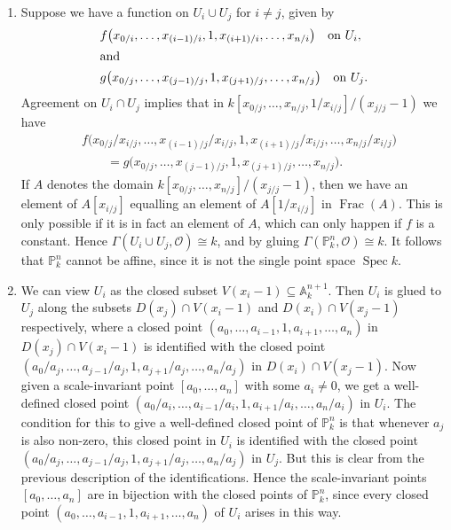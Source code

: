 \documentclass{report}
\renewcommand{\O}{\mathscr{O}} %
\newcommand{\A}{\mathbb{A}}
\renewcommand{\P}{\mathbb{P}} %
\DeclareMathOperator{\Frac}{Frac}
\DeclareMathOperator{\Spec}{Spec}
\begin{document}
\begin{enumerate}[label=\textbf{4.4.\Alph*.}]
	\item Suppose we have a function on $U_i\cup U_j$ for $i\ne j$, given by
	      \begin{align*}
		       & f\bigl(x_{0/i},\ldots,x_{(i-1)/i},1,x_{(i+1)/i},\ldots,x_{n/i}\bigr)
		      \quad\text{on $U_i$},                                                   \\
		      \intertext{and}
		       & g\bigl(x_{0/j},\ldots,x_{(j-1)/j},1,x_{(j+1)/j},\ldots,x_{n/j}\bigr)
		      \quad\text{on $U_j$}.
	      \end{align*}
	      Agreement on $U_i\cap U_j$ implies that in
	      $k[x_{0/j},\ldots,x_{n/j},1/x_{i/j}]/(x_{j/j}-1)$ we have
	      \begin{align*}
		       & f\bigl(x_{0/j}/x_{i/j},\ldots,x_{(i-1)/j}/x_{i/j},1,x_{(i+1)/j}/x_{i/j},\ldots,x_{n/j}/x_{i/j}\bigr) \\
		       & \qquad= g\bigl(x_{0/j},\ldots,x_{(j-1)/j},1,x_{(j+1)/j},\ldots,x_{n/j}\bigr).
	      \end{align*}
	      If $A$ denotes the domain $k[x_{0/j},\ldots,x_{n/j}]/(x_{j/j}-1)$, then
	      we have an element of $A[x_{i/j}]$ equalling an element of $A[1/x_{i/j}]$
	      in $\Frac(A)$. This is only possible if it is in fact an element of $A$,
	      which can only happen if $f$ is a constant. Hence
	      $\Gamma(U_i\cup U_j,\O)\cong k$, and by gluing
	      $\Gamma(\P^n_k,\O)\cong k$. It follows that $\P^n_k$ cannot be affine,
	      since it is not the single point space $\Spec k$.

	\item We can view $U_i$ as the closed subset $V(x_i-1)\subseteq\A^{n+1}_k$.
	      Then $U_i$ is glued to $U_j$ along the subsets $D(x_j)\cap V(x_i-1)$
	      and $D(x_i)\cap V(x_j-1)$ respectively, where a closed point
	      $(a_0,\ldots,a_{i-1},1,a_{i+1},\ldots,a_n)$ in $D(x_j)\cap V(x_i-1)$ is
	      identified with the closed point
	      $(a_0/a_j,\ldots,a_{j-1}/a_j,1,a_{j+1}/a_j,\ldots,a_n/a_j)$ in
	      $D(x_i)\cap V(x_j-1)$. Now given a scale-invariant point
	      $[a_0,\ldots,a_n]$ with some $a_i\ne0$, we get a well-defined closed
	      point $(a_0/a_i,\ldots,a_{i-1}/a_i,1,a_{i+1}/a_i,\ldots,a_n/a_i)$ in
	      $U_i$. The condition for this to give a well-defined closed point of
	      $\P^n_k$ is that whenever $a_j$ is also non-zero, this closed point in
	      $U_i$ is identified with the closed point
	      $(a_0/a_j,\ldots,a_{j-1}/a_j,1,a_{j+1}/a_j,\ldots,a_n/a_j)$ in $U_j$.
	      But this is clear from the previous description of the identifications.
	      Hence the scale-invariant points $[a_0,\ldots,a_n]$ are in bijection
	      with the closed points of $\P^n_k$, since every closed point
	      $(a_0,\ldots,a_{i-1},1,a_{i+1},\ldots,a_n)$ of $U_i$ arises in this
	      way.
\end{enumerate}
\end{document}
